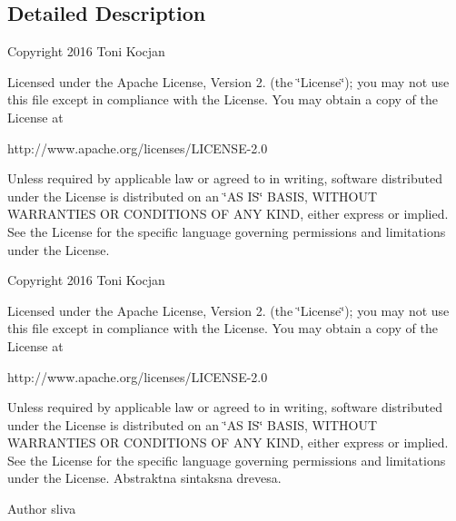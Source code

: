 \subsection{Detailed Description}
Copyright 2016 Toni Kocjan

Licensed under the Apache License, Version 2. (the \char`\"{}\+License\char`\"{}); you may not use this file except in compliance with the License. You may obtain a copy of the License at \begin{DoxyVerb}http://www.apache.org/licenses/LICENSE-2.0
\end{DoxyVerb}


Unless required by applicable law or agreed to in writing, software distributed under the License is distributed on an \char`\"{}\+A\+S I\+S\char`\"{} B\+A\+S\+IS, W\+I\+T\+H\+O\+UT W\+A\+R\+R\+A\+N\+T\+I\+ES OR C\+O\+N\+D\+I\+T\+I\+O\+NS OF A\+NY K\+I\+ND, either express or implied. See the License for the specific language governing permissions and limitations under the License.

Copyright 2016 Toni Kocjan

Licensed under the Apache License, Version 2. (the \char`\"{}\+License\char`\"{}); you may not use this file except in compliance with the License. You may obtain a copy of the License at \begin{DoxyVerb}http://www.apache.org/licenses/LICENSE-2.0
\end{DoxyVerb}


Unless required by applicable law or agreed to in writing, software distributed under the License is distributed on an \char`\"{}\+A\+S I\+S\char`\"{} B\+A\+S\+IS, W\+I\+T\+H\+O\+UT W\+A\+R\+R\+A\+N\+T\+I\+ES OR C\+O\+N\+D\+I\+T\+I\+O\+NS OF A\+NY K\+I\+ND, either express or implied. See the License for the specific language governing permissions and limitations under the License. Abstraktna sintaksna drevesa.

\begin{DoxyAuthor}{Author}
sliva 
\end{DoxyAuthor}
